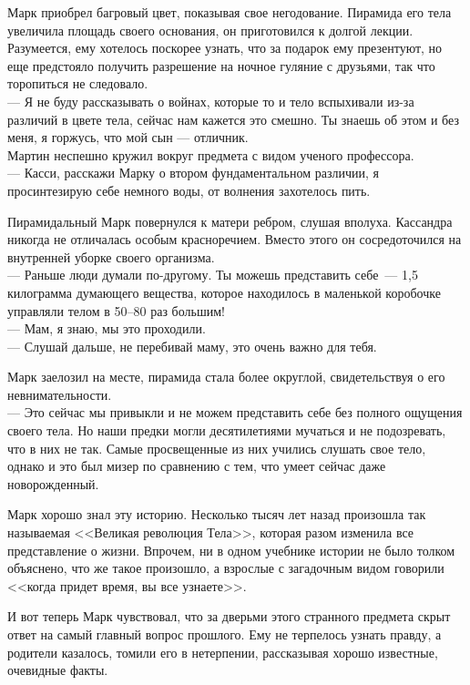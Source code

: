 Марк приобрел багровый цвет, показывая свое негодование. Пирамида его тела 
увеличила площадь своего основания, он приготовился к долгой лекции. 
Разумеется, ему хотелось поскорее узнать, что за подарок ему презентуют, но еще 
предстояло получить разрешение на ночное гуляние с друзьями, так что торопиться 
не следовало.\\
--- Я не буду рассказывать о войнах, которые то и тело вспыхивали из-за 
различий в цвете тела, сейчас нам кажется это смешно. Ты знаешь об этом и без 
меня, я горжусь, что мой сын --- отличник.\\
Мартин неспешно кружил вокруг предмета с видом ученого профессора.\\
--- Касси, расскажи Марку о втором фундаментальном различии, я просинтезирую 
себе немного воды, от волнения захотелось пить.

Пирамидальный Марк повернулся к матери ребром, слушая вполуха. Кассандра 
никогда не отличалась особым красноречием. Вместо этого он сосредоточился на 
внутренней уборке своего организма.\\
--- Раньше люди думали по-другому. Ты можешь представить себе~--- 1,5 
килограмма думающего вещества, которое находилось в маленькой коробочке 
управляли телом в 50--80 раз большим!\\
--- Мам, я знаю, мы это проходили.\\
--- Слушай дальше, не перебивай маму, это очень важно для тебя.

Марк заелозил на месте, пирамида стала более округлой, свидетельствуя о его 
невнимательности.\\
--- Это сейчас мы привыкли и не можем представить себе без полного ощущения 
своего тела. Но наши предки могли десятилетиями мучаться и не подозревать, что 
в них не так. Самые просвещенные из них учились слушать свое тело, однако и это 
был мизер по сравнению с тем, что умеет сейчас даже новорожденный.

Марк хорошо знал эту историю. Несколько тысяч лет назад произошла так 
называемая <<Великая революция Тела>>, которая разом изменила все представление 
о жизни. Впрочем, ни в одном учебнике истории не было толком объяснено, что же 
такое произошло, а взрослые с загадочным видом говорили <<когда придет время, 
вы все узнаете>>.

И вот теперь Марк чувствовал, что за дверьми этого странного предмета скрыт 
ответ на самый главный вопрос прошлого. Ему не терпелось узнать правду, а 
родители казалось, томили его в нетерпении, рассказывая хорошо известные, 
очевидные факты.

